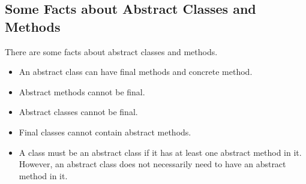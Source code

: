 \documentclass[letterpaper,12pt]{article}
\begin{document}
\subsection{Some Facts about Abstract Classes and Methods}
There are some facts about abstract classes and methods.
\begin{itemize}
    \item An abstract class can have final methods and concrete method.
    \item Abstract methods cannot be final.
    \item Abstract classes cannot be final.
    \item Final classes cannot contain abstract methods.
    \item A class must be an abstract class if it has at least one abstract method in it. However, an abstract class does not necessarily need to have an abstract method in it.
\end{itemize}
\end{document}
